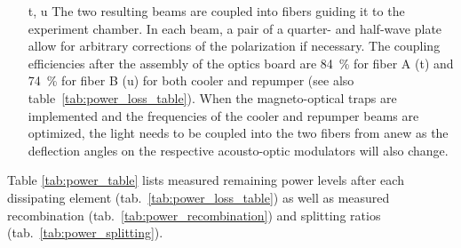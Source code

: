 \begin{itemize}
    \item[t, u] The two resulting beams are coupled into fibers guiding it to the experiment chamber. In each beam, a pair of a quarter- and half-wave plate allow for arbitrary corrections of the polarization if necessary. The coupling efficiencies after the assembly of the optics board are \SI{84}{\percent} for fiber A (t) and \SI{74}{\percent} for fiber B (u) for both cooler and repumper (see also table~\ref{tab:power_loss_table}). When the magneto-optical traps are implemented and the frequencies of the cooler and repumper beams are optimized, the light needs to be coupled into the two fibers from anew as the deflection angles on the respective acousto-optic modulators will also change.
\end{itemize}

Table \ref{tab:power_table} lists measured remaining power levels after each dissipating element (tab.~\ref{tab:power_loss_table}) as well as measured recombination (tab.~\ref{tab:power_recombination}) and splitting ratios (tab.~\ref{tab:power_splitting}).

